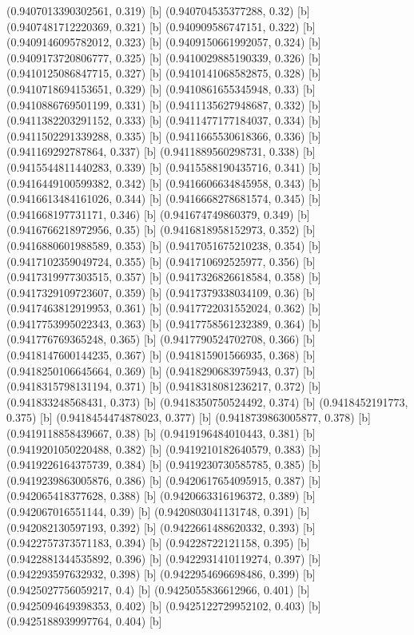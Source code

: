 {{{(0.9407013390302561, 0.319) [b] 
(0.940704535377288, 0.32) [b] 
(0.9407481712220369, 0.321) [b] 
(0.940909586747151, 0.322) [b] 
(0.9409146095782012, 0.323) [b] 
(0.9409150661992057, 0.324) [b] 
(0.9409173720806777, 0.325) [b] 
(0.9410029885190339, 0.326) [b] 
(0.9410125086847715, 0.327) [b] 
(0.9410141068582875, 0.328) [b] 
(0.9410718694153651, 0.329) [b] 
(0.9410861655345948, 0.33) [b] 
(0.9410886769501199, 0.331) [b] 
(0.9411135627948687, 0.332) [b] 
(0.9411382203291152, 0.333) [b] 
(0.9411477177184037, 0.334) [b] 
(0.9411502291339288, 0.335) [b] 
(0.9411665530618366, 0.336) [b] 
(0.941169292787864, 0.337) [b] 
(0.9411889560298731, 0.338) [b] 
(0.9415544811440283, 0.339) [b] 
(0.9415588190435716, 0.341) [b] 
(0.9416449100599382, 0.342) [b] 
(0.9416606634845958, 0.343) [b] 
(0.9416613484161026, 0.344) [b] 
(0.9416668278681574, 0.345) [b] 
(0.941668197731171, 0.346) [b] 
(0.941674749860379, 0.349) [b] 
(0.9416766218972956, 0.35) [b] 
(0.9416818958152973, 0.352) [b] 
(0.9416880601988589, 0.353) [b] 
(0.9417051675210238, 0.354) [b] 
(0.9417102359049724, 0.355) [b] 
(0.941710692525977, 0.356) [b] 
(0.9417319977303515, 0.357) [b] 
(0.9417326826618584, 0.358) [b] 
(0.9417329109723607, 0.359) [b] 
(0.9417379338034109, 0.36) [b] 
(0.9417463812919953, 0.361) [b] 
(0.9417722031552024, 0.362) [b] 
(0.9417753995022343, 0.363) [b] 
(0.9417758561232389, 0.364) [b] 
(0.941776769365248, 0.365) [b] 
(0.9417790524702708, 0.366) [b] 
(0.9418147600144235, 0.367) [b] 
(0.941815901566935, 0.368) [b] 
(0.9418250106645664, 0.369) [b] 
(0.9418290683975943, 0.37) [b] 
(0.9418315798131194, 0.371) [b] 
(0.9418318081236217, 0.372) [b] 
(0.941833248568431, 0.373) [b] 
(0.9418350750524492, 0.374) [b] 
(0.9418452191773, 0.375) [b] 
(0.9418454474878023, 0.377) [b] 
(0.9418739863005877, 0.378) [b] 
(0.9419118858439667, 0.38) [b] 
(0.9419196484010443, 0.381) [b] 
(0.9419201050220488, 0.382) [b] 
(0.9419210182640579, 0.383) [b] 
(0.9419226164375739, 0.384) [b] 
(0.9419230730585785, 0.385) [b] 
(0.9419239863005876, 0.386) [b] 
(0.9420617654095915, 0.387) [b] 
(0.942065418377628, 0.388) [b] 
(0.9420663316196372, 0.389) [b] 
(0.942067016551144, 0.39) [b] 
(0.9420803041131748, 0.391) [b] 
(0.942082130597193, 0.392) [b] 
(0.9422661488620332, 0.393) [b] 
(0.9422757373571183, 0.394) [b] 
(0.94228722121158, 0.395) [b] 
(0.9422881344535892, 0.396) [b] 
(0.9422931410119274, 0.397) [b] 
(0.942293597632932, 0.398) [b] 
(0.9422954696698486, 0.399) [b] 
(0.9425027756059217, 0.4) [b] 
(0.9425055836612966, 0.401) [b] 
(0.9425094649398353, 0.402) [b] 
(0.9425122729952102, 0.403) [b] 
(0.9425188939997764, 0.404) [b] 
}}}
